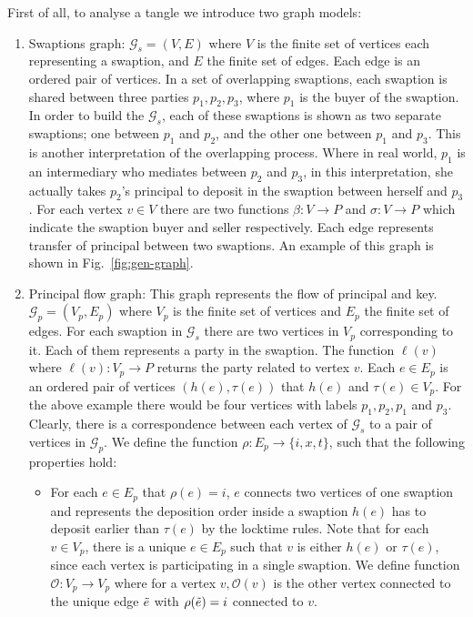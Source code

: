 First of all, to analyse a tangle we introduce two graph models:

\begin{enumerate}
    \item Swaptions graph: $\mathcal{G}_s=(V, E)$ where $V$ is the finite set of vertices each representing a swaption, and $E$ the finite set of edges. Each edge is an ordered pair of vertices. In a set of overlapping swaptions, each swaption is shared between three parties $p_1, p_2, p_3$, where $p_1$ is the buyer of the swaption. In order to build the $\mathcal{G}_s$, each of these swaptions is shown as two separate swaptions; one between $p_1$ and $p_2$, and the other one between $p_1$ and $p_3$. This is another interpretation of the overlapping process. Where in real world, $p_1$ is an intermediary who mediates between $p_2$ and $p_3$, in this interpretation, she actually takes $p_2$'s principal to deposit in the swaption between herself and $p_3$. For each vertex $v \in V$ there are two functions $\beta: V \to P$ and $\sigma: V \to P$ which indicate the swaption buyer and seller respectively. Each edge represents transfer of principal between two swaptions. An example of this graph is shown in Fig.~\ref{fig:gen-graph}.

    
    \item Principal flow graph: This graph represents the flow of principal and \keyone key. $\mathcal{G}_{p} = (V_p,E_p)$ where $V_p$ is the finite set of vertices and $E_p$ the finite set of edges.
    For each swaption in $\mathcal{G}_s$ there are two vertices in $V_p$ corresponding to it. Each of them represents a party in the swaption. The function $\ell(v)$ where $\ell(v): V_p \to P$ returns the party related to vertex $v$. Each $e \in E_p$ is an ordered pair of vertices $(h(e), \tau(e))$ that $h(e)$ and $\tau(e) \in V_p$. For the above example there would be four vertices with labels $p_1, p_2, p_1$ and $p_3$. Clearly, there is a correspondence between each vertex of $\mathcal{G}_s$ to a pair of vertices in $\mathcal{G}_{p}$. We define the function $\rho: E_p \to \{i, x, t\}$, such that the following properties hold:
    \begin{itemize}
        \item For each $e \in E_p$ that $\rho(e) = i$, $e$ connects two vertices of one swaption and represents the deposition order inside a swaption \ie $h(e)$ has to deposit earlier than $\tau(e)$ by the locktime rules. Note that for each $v \in V_p$, there is a unique $e \in E_p$ such that $v$ is either $h(e)$ or $\tau(e)$, since each vertex is participating in a single swaption. We define function $\mathcal{O}: V_p \to V_p$ where for a vertex $v, \mathcal{O}(v)$ is the other vertex connected to the unique edge $\Tilde{e}$ with $\rho(\Tilde{e}) = i$ connected to $v$.
        

\end{itemize}
\end{enumerate}
